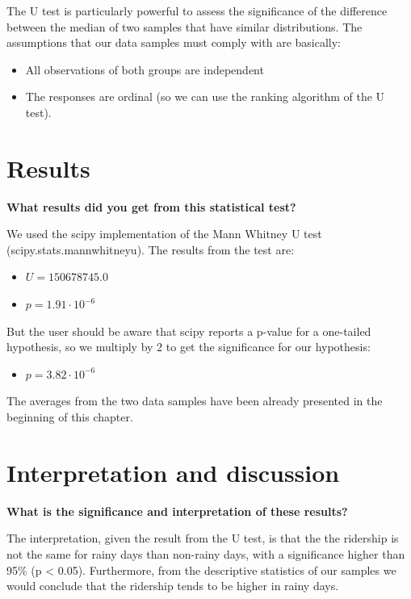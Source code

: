 \documentclass[a4paper,12pt,english]{sphinxmanual}
\begin{document}
The U test is particularly powerful to assess the significance of the difference
between the median of two samples that have similar distributions. The
assumptions that our data samples must comply with are basically:
\begin{itemize}
\item {} 
All observations of both groups are independent

\item {} 
The responses are ordinal (so we can use the ranking algorithm of the U test).

\end{itemize}


\section{Results}
\label{section1:results}
\textbf{What results did you get from this statistical test?}

We used the scipy implementation of the Mann Whitney U test
(scipy.stats.mannwhitneyu). The results from the test are:
\begin{itemize}
\item {} 
\(U = 150678745.0\)

\item {} 
\(p = 1.91 \cdot 10^{-6}\)

\end{itemize}

But the user should be aware that scipy reports a p-value for a one-tailed
hypothesis, so we multiply by 2 to get the significance for our hypothesis:
\begin{itemize}
\item {} 
\(p = 3.82 \cdot 10^{-6}\)

\end{itemize}

The averages from the two data samples have been already presented in the beginning
of this chapter.


\section{Interpretation and discussion}
\label{section1:interpretation-and-discussion}
\textbf{What is the significance and interpretation of these results?}

The interpretation, given the result from the U test, is that the the ridership
is not the same for rainy days than non-rainy days, with a significance higher
than 95\% (p \textless{} 0.05). Furthermore, from the descriptive statistics of our samples
we would conclude that the ridership tends to be higher in rainy days.
\end{document}
